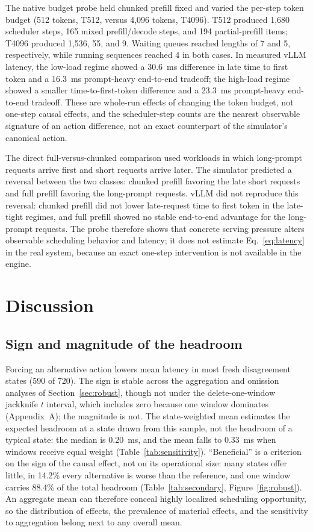 \documentclass[preprint,12pt]{elsarticle}
\begin{document}
The native budget probe held chunked prefill fixed and varied the per-step
token budget (512 tokens, T512, versus 4,096 tokens, T4096). T512 produced
1,680 scheduler steps, 165 mixed prefill/decode steps, and 194 partial-prefill
items; T4096 produced 1,536, 55, and 9. Waiting queues reached lengths of 7 and
5, respectively, while running sequences reached 4 in both cases. In measured vLLM latency, the low-load
regime showed a 30.6~ms difference in late time to first token and a 16.3~ms
prompt-heavy end-to-end tradeoff; the high-load regime showed a smaller
time-to-first-token difference and a 23.3~ms prompt-heavy end-to-end tradeoff.
These are whole-run effects of changing the token budget, not one-step causal
effects, and the scheduler-step counts are the nearest observable signature of
an action difference, not an exact counterpart of the simulator's canonical
action.

The direct full-versus-chunked comparison used workloads in which long-prompt
requests arrive first and short requests arrive later. The simulator predicted
a reversal between the two classes: chunked prefill favoring the late short
requests and full prefill favoring the long-prompt requests. vLLM did not
reproduce this reversal: chunked prefill did not lower late-request time to
first token in the late-tight regimes, and full prefill showed no stable
end-to-end advantage for the long-prompt requests. The probe therefore shows
that concrete serving pressure alters observable scheduling behavior and
latency; it does not estimate Eq.~\ref{eq:latency} in the real system, because
an exact one-step intervention is not available in the engine.

\section{Discussion}
\label{sec:discussion}

\subsection{Sign and magnitude of the headroom}
Forcing an alternative action lowers mean latency in most fresh disagreement
states (590 of 720). The sign is stable across the aggregation and omission analyses of
Section~\ref{sec:robust}, though not under the delete-one-window jackknife
$t$ interval, which includes zero because one window dominates
(Appendix~A); the magnitude is not. The state-weighted mean
estimates the expected headroom at a state drawn from this sample, not the
headroom of a typical state: the median is 0.20~ms, and the mean
falls to 0.33~ms when windows receive equal weight
(Table~\ref{tab:sensitivity}). ``Beneficial'' is a criterion on the
sign of the causal effect, not on its operational size: many states offer little,
in 14.2\% every alternative is worse than the reference, and one window carries
88.4\% of the total headroom
(Table~\ref{tab:secondary}, Figure~\ref{fig:robust}). An aggregate mean can
therefore conceal highly localized scheduling opportunity, so the
distribution of effects, the prevalence of material effects, and the sensitivity
to aggregation belong next to any overall mean.
\end{document}
